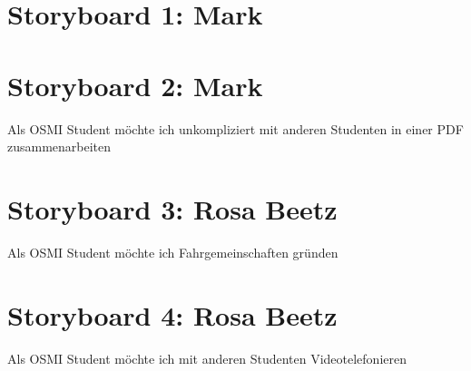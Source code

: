 \documentclass{article}
\begin{document}
\newpage

\section{Storyboard 1: Mark}

\newpage

\section{Storyboard 2: Mark}

Als OSMI Student möchte ich unkompliziert mit anderen Studenten in einer PDF zusammenarbeiten

\newpage

\section{Storyboard 3: Rosa Beetz}

Als OSMI Student möchte ich Fahrgemeinschaften gründen

\newpage

\section{Storyboard 4: Rosa Beetz}

Als OSMI Student möchte ich mit anderen Studenten Videotelefonieren

\newpage
\end{document}
